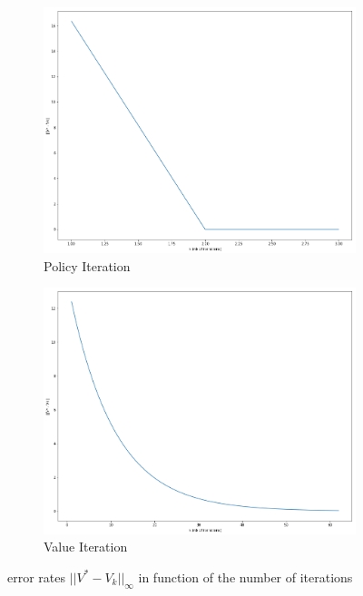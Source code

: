 \documentclass[11pt]{article}
\numberwithin{figure}{section} %
\begin{document}
\begin{figure}[H]
\centering
\begin{subfigure}{.5\textwidth}
  \centering
  \includegraphics[width=1\linewidth]{images/Q3_PI}
  \caption{Policy Iteration}
  \label{fig:PI}
\end{subfigure}%
\begin{subfigure}{.5\textwidth}
  \centering
  \includegraphics[width=1\linewidth]{images/Q3_VI}
  \caption{Value Iteration}
  \label{fig:VI}
\end{subfigure}
\caption{error rates $||V^{*} - V_k||_{\infty}$ in function of the number of iterations}
\label{fig:error_rate}
\end{figure}
\end{document}
